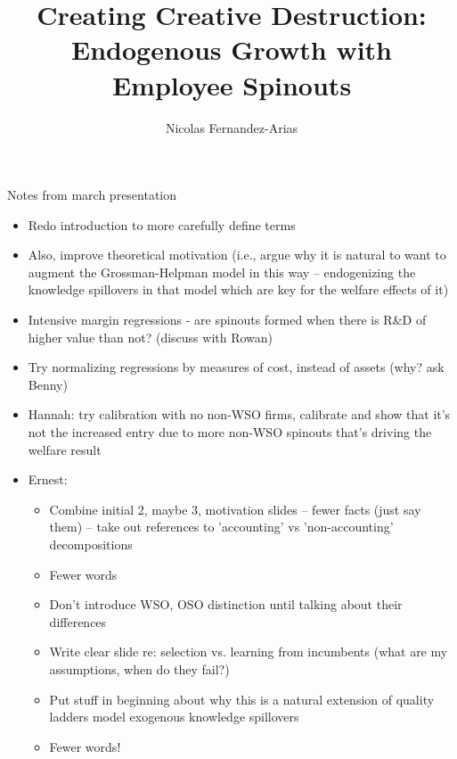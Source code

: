 \documentclass[english,usenames,dvipsnames]{beamer}
\title{Creating Creative Destruction: Endogenous Growth with Employee Spinouts}
\author{Nicolas Fernandez-Arias}
\begin{document}
\maketitle


\begin{frame}{Notes from march presentation}
\begin{itemize}
	\footnotesize
	\item Redo introduction to more carefully define terms
	\item Also, improve theoretical motivation (i.e., argue why it is natural to want to augment the Grossman-Helpman model in this way -- endogenizing the knowledge spillovers in that model which are key for the welfare effects of it)
	\item Intensive margin regressions - are spinouts formed when there is R\&D of higher value than not? (discuss with Rowan)
	\item Try normalizing regressions by measures of cost, instead of assets (why? ask Benny)
	\item Hannah: try calibration with no non-WSO firms, calibrate and show that it's not the increased entry due to more non-WSO spinouts that's driving the welfare result
	\item Ernest: 
	\begin{itemize}
		\footnotesize
		\item Combine initial 2, maybe 3, motivation slides -- fewer facts (just say them) -- take out references to 'accounting' vs 'non-accounting' decompositions
		\item Fewer words
		\item Don't introduce WSO, OSO distinction until talking about their differences
		\item Write clear slide re: selection vs. learning from incumbents (what are my assumptions, when do they fail?)
		\item Put stuff in beginning about why this is a natural extension of quality ladders model exogenous knowledge spillovers
		\item Fewer words!
	\end{itemize}
\end{itemize}
\end{frame}
\end{document}
